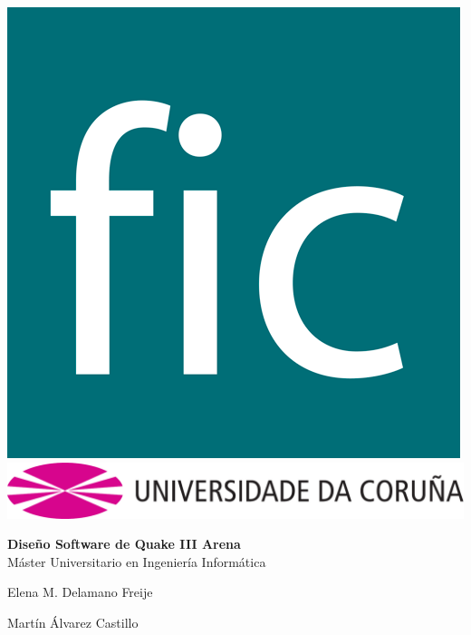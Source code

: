\documentclass[a4paper,12pt]{report}
\begin{document}
	

	
	\begin{titlepage}
		\begin{center}
			\includegraphics[scale=0.15]{images/fic01.png} \\ 
			\vspace{2cm} \includegraphics[scale=.4]{images/udc.pdf} \\
			
			
			\vspace{2.5cm}
			
			\textbf{\Large Diseño Software de Quake III Arena}\\
			\vspace{0.5cm}
			\large{Máster Universitario en Ingeniería Informática}\\
		\end{center}
		
		\vspace{7.2cm}
		\begin{flushright}
			\noindent Elena M. Delamano Freije
			
			\noindent Martín Álvarez Castillo
			
		\end{flushright}
	\end{titlepage}
	\clearpage
	
\end{document}
